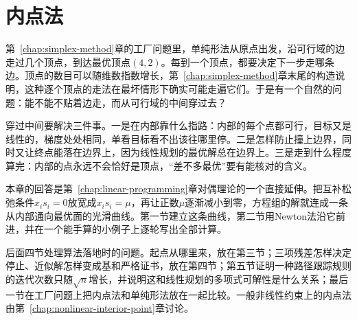 \chapter{内点法}
\label{chap:lp-interior-point}

第~\ref{chap:simplex-method}章的工厂问题里，单纯形法从原点出发，沿可行域的边走过几个顶点，到达最优顶点$(4,2)$。每到一个顶点，都要决定下一步走哪条边。顶点的数目可以随维数指数增长，第~\ref{chap:simplex-method}章末尾的构造说明，这种逐个顶点的走法在最坏情形下确实可能走遍它们。于是有一个自然的问题：能不能不贴着边走，而从可行域的中间穿过去？

穿过中间要解决三件事。一是在内部靠什么指路：内部的每个点都可行，目标又是线性的，梯度处处相同，单看目标看不出该往哪里停。二是怎样防止撞上边界，同时又让终点能落在边界上，因为线性规划的最优解总在边界上。三是走到什么程度算完：内部的点永远不会恰好是顶点，“差不多最优”要有能核对的含义。

本章的回答是第~\ref{chap:linear-programming}章对偶理论的一个直接延伸。把互补松弛条件$x_is_i=0$放宽成$x_is_i=\mu$，再让正数$\mu$逐渐减小到零，方程组的解就连成一条从内部通向最优面的光滑曲线。第一节建立这条曲线，第二节用Newton法沿它前进，并在一个能手算的小例子上逐轮写出全部计算。

后面四节处理算法落地时的问题。起点从哪里来，放在第三节；三项残差怎样决定停止、近似解怎样变成基和严格证书，放在第四节；第五节证明一种路径跟踪规则的迭代次数只随$\sqrt{n}$增长，并说明这和线性规划的多项式可解性是什么关系；最后一节在工厂问题上把内点法和单纯形法放在一起比较。一般非线性约束上的内点法由第~\ref{chap:nonlinear-interior-point}章讨论。








